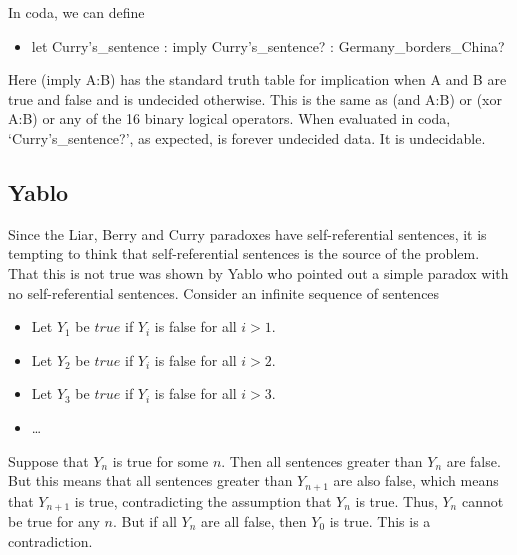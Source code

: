 \documentclass[11pt]{article}
\begin{document}
In coda, we can define
\begin{itemize}
\item let Curry's\_sentence : imply Curry's\_sentence? : Germany\_borders\_China?
\end{itemize}
Here (imply A:B) has the standard truth table for implication when A and B are true and false and
is undecided otherwise.  This is the same as (and A:B) or (xor A:B) or any of the 16 binary logical operators.
When evaluated in coda, `Curry's\_sentence?', as expected, is forever undecided data.  It is undecidable.

\subsection{Yablo}

     Since the Liar, Berry and Curry paradoxes have self-referential sentences, it is tempting to think
that self-referential sentences is the source of the problem.  That this is not true was shown by Yablo\cite{Yablo} who
pointed out a simple paradox with no self-referential sentences.  Consider an infinite sequence
of sentences
\begin{itemize}
\item Let $Y_1$ be $true$ if $Y_i$ is false for all $i>1$.
\item Let $Y_2$ be $true$ if $Y_i$ is false for all $i>2$.
\item Let $Y_3$ be $true$ if $Y_i$ is false for all $i>3$.
\item \dots
\end{itemize}
Suppose that $Y_n$ is true for some $n$.  Then all sentences greater than $Y_n$ are false.  But this means
that all sentences greater than $Y_{n+1}$ are also false, which means that $Y_{n+1}$ is true, contradicting
the assumption that $Y_n$ is true.  Thus, $Y_n$ cannot be true for any $n$.  But if all $Y_n$ are all false, then
$Y_0$ is true.  This is a contradiction.
\end{document}
